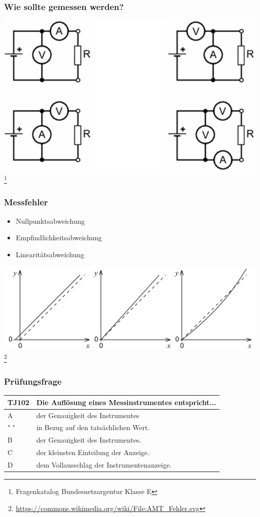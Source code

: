 \begin{frame}
    \frametitle{Wie sollte gemessen werden?}
        \includegraphics[width=1\textwidth]{e17/stromSpannung.png}
        \footnote{\tiny Fragenkatalog Bundesnetzargentur Klasse E}
\end{frame}

\begin{frame}
    \frametitle{Messfehler}
    \begin{center}
    		\begin{itemize}
				\item Nullpunktsabweichung
				\item Empfindlichkeitsabweichung
				\item Linearitätsabweichung
    		\end{itemize}
        \includegraphics[width=1\textwidth]{e17/werMisstMisst.png}
        \footnote{\tiny \url{https://commons.wikimedia.org/wiki/File:AMT_Fehler.svg}}
	\end{center}
\end{frame}

\begin{frame}
    \frametitle{Prüfungsfrage}
    \begin{center}
    \begin{tabular}{l||l}\hline
        TJ102 & Die Auflösung eines Messinstrumentes entspricht... \\  \hline\hline
         A  & der Genauigkeit des Instrumentes \\
         " " & in Bezug auf den tatsächlichen Wert. \\ \hline
         B & der Genauigkeit des Instrumentes. \\ \hline
         C & der kleinsten Einteilung der Anzeige. \\\hline
         D & dem Vollausschlag der Instrumentenanzeige. \\\hline
    \end{tabular}
 	\end{center}
\end{frame}

